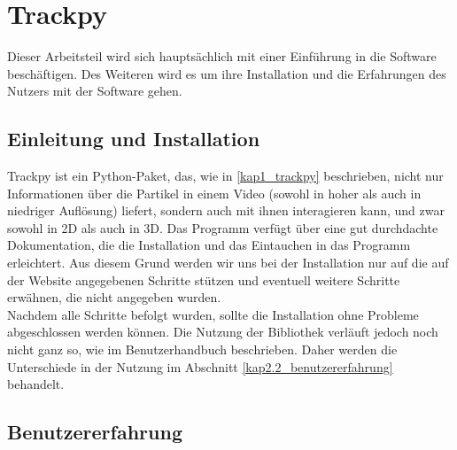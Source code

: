 \chapter{Trackpy \label{kap2}}

Dieser Arbeitsteil  wird sich hauptsächlich mit einer Einführung in die Software beschäftigen. Des Weiteren wird es um ihre Installation und die Erfahrungen des Nutzers mit der Software gehen.

\section{Einleitung und Installation \label{Kap2.1_Einleitung_Installation}}
Trackpy ist ein Python-Paket, das, wie in \ref{kap1_trackpy} beschrieben, nicht nur Informationen über die Partikel in einem Video (sowohl in hoher als auch in niedriger Auflösung) liefert, sondern auch mit ihnen interagieren kann, und zwar sowohl in 2D als auch in 3D. Das Programm verfügt über eine gut durchdachte Dokumentation, die die Installation und das Eintauchen in das Programm erleichtert.
Aus diesem Grund werden wir uns bei der Installation nur auf die auf der Website \cite{tp_installation} angegebenen Schritte stützen und eventuell weitere Schritte erwähnen, die nicht angegeben wurden.\\
Nachdem alle Schritte befolgt wurden, sollte die Installation ohne Probleme abgeschlossen werden können. Die Nutzung der Bibliothek verläuft jedoch noch nicht ganz so, wie im Benutzerhandbuch beschrieben. Daher werden die Unterschiede in der Nutzung im Abschnitt \ref{kap2.2_benutzererfahrung} behandelt.


\section{Benutzererfahrung \label{kap2.2_benutzererfahrung}}

